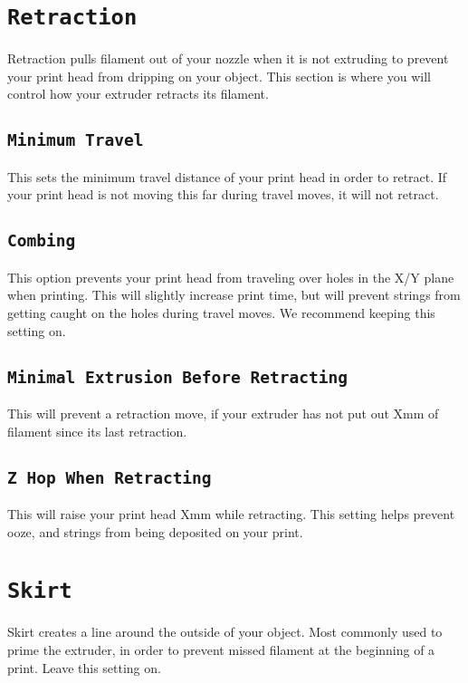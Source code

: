 \section{\texttt{Retraction}}
Retraction pulls filament out of your nozzle when it is not extruding to prevent your print head from dripping on your object. This section is where you will control how your extruder retracts its filament.

\subsection{\texttt{Minimum Travel}}
This sets the minimum travel distance of your print head in order to retract. If your print head is not moving this far during travel moves, it will not retract.

\subsection{\texttt{Combing}}
This option prevents your print head from traveling over holes in the X/Y plane when printing. This will slightly increase print time, but will prevent strings from getting caught on the holes during travel moves. We recommend keeping this setting on.

\subsection{\texttt{Minimal Extrusion Before Retracting}}
This will prevent a retraction move, if your extruder has not put out Xmm of filament since its last retraction.

\subsection{\texttt{Z Hop When Retracting}}
This will raise your print head Xmm while retracting. This setting helps prevent ooze, and strings from being deposited on your print. 

\section{\texttt{Skirt}}
Skirt creates a line around the outside of your object. Most commonly used to prime the extruder, in order to prevent missed filament at the beginning of a print. Leave this setting on.


